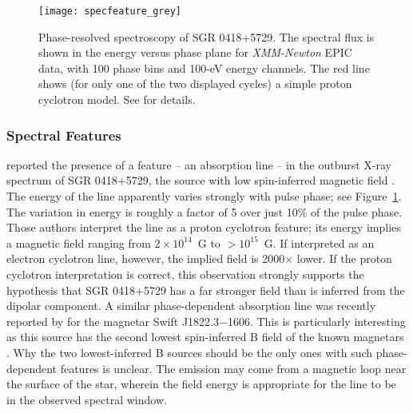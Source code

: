\begin{figure}
\texttt{[image: specfeature\_grey]}
\caption{
Phase-resolved spectroscopy of SGR 0418+5729.
The spectral flux is shown in the energy versus phase plane for {\it XMM-Newton} EPIC data, with
100 phase bins and 100-eV energy channels.
The red line shows (for only one of the two displayed cycles) 
a simple proton cyclotron model. 
See \citet{tem+13} for details.}
\label{fig:specfeature}
\end{figure}

\subsubsection{Spectral Features}

\citet{tem+13} reported the presence of a feature -- an absorption line --
in the outburst X-ray spectrum of SGR 0418+5729, the source
with low spin-inferred magnetic field \citep{ret+10}.  The
energy of the line apparently varies strongly with pulse phase;
see Figure~\ref{fig:specfeature}.  The variation in energy is roughly a factor of 5
over just 10\% of the pulse phase.
Those authors interpret the line as a proton cyclotron feature; its energy implies a magnetic field
ranging from $2 \times 10^{14}$~G to $>10^{15}$~G.  If interpreted as an electron cyclotron line, however,
the implied field is 2000$\times$ lower.  If the proton cyclotron interpretation is correct,
this observation strongly supports the hypothesis that SGR 0418+5729 has a far stronger field than
is inferred from the dipolar component. 
A similar phase-dependent absorption line was
recently reported by \citet{rit+16} for the magnetar Swift J1822.3$-$1606.  This is particularly
interesting as this source has the second lowest spin-inferred B field of the known magnetars 
\citep{rie+12,skc14,rit+16}.  Why the two lowest-inferred B sources
should be the only ones with such phase-dependent features is unclear.  The emission may come
from a magnetic loop near the surface of the star, wherein the field
energy is appropriate for the line to be in the observed spectral window.



